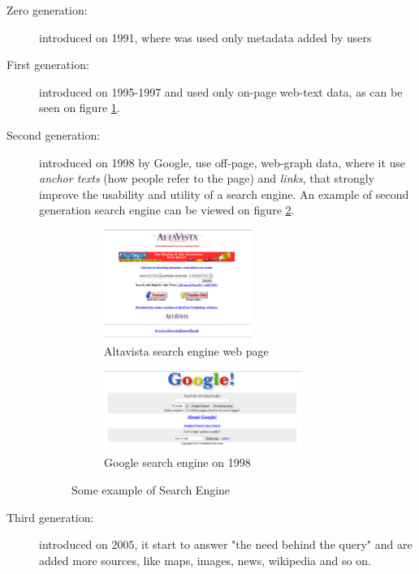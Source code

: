 \begin{description}
    \item [Zero generation: ] introduced on 1991, where was used only metadata added by users
    \item [First generation: ] introduced on 1995-1997 and used only on-page web-text data, as can be seen on 
                               figure \ref{img:altavista}.
                               \begin{figure}
                                \end{figure}
    \item [Second generation: ] introduced on 1998 by Google, use off-page, web-graph data, where it
                                use \emph{anchor texts} (how people refer to the page) and \emph{links}, that
                                strongly improve the usability and utility of a search engine.
                                An example of second generation search engine can be viewed on figure \ref{img:google}.
                                \begin{figure}
				    \begin{subfigure}{0.5\textwidth}
                                    	\includegraphics[width=0.6\textwidth]{Images/altavista}
                                    	\caption{Altavista search engine web page}
                                    	\label{img:altavista}
				    \end{subfigure}
				    \begin{subfigure}{0.6\textwidth}
                                    	\includegraphics[width=0.8\textwidth]{Images/google}
                                    	\caption{Google search engine on 1998}
                                    	\label{img:google}
				    \end{subfigure}
				    \caption{Some example of Search Engine}
				    \label{img:generationSearch}
                                \end{figure}
    \item [Third generation: ] introduced on $2005$, it start to answer "the need behind the query" and are
                               added more sources, like maps, images, news, wikipedia and so on. 


\end{description}
